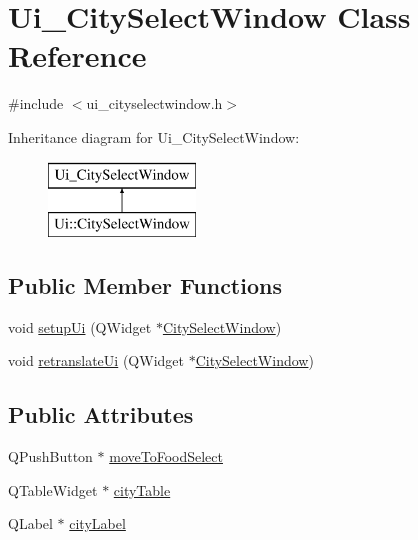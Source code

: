 \hypertarget{class_ui___city_select_window}{}\section{Ui\+\_\+\+City\+Select\+Window Class Reference}
\label{class_ui___city_select_window}


{\ttfamily \#include $<$ui\+\_\+cityselectwindow.\+h$>$}

Inheritance diagram for Ui\+\_\+\+City\+Select\+Window\+:\begin{figure}[H]
\begin{center}
\leavevmode
\includegraphics[height=2.000000cm]{class_ui___city_select_window}
\end{center}
\end{figure}
\subsection*{Public Member Functions}
\begin{DoxyCompactItemize}
\item 
void \mbox{\hyperlink{class_ui___city_select_window_a0984abfece713da5e3ef219fd6b4b640}{setup\+Ui}} (Q\+Widget $\ast$\mbox{\hyperlink{class_city_select_window}{City\+Select\+Window}})
\item 
void \mbox{\hyperlink{class_ui___city_select_window_ae7ea20821b449c19c09ae9ca73f03daf}{retranslate\+Ui}} (Q\+Widget $\ast$\mbox{\hyperlink{class_city_select_window}{City\+Select\+Window}})
\end{DoxyCompactItemize}
\subsection*{Public Attributes}
\begin{DoxyCompactItemize}
\item 
Q\+Push\+Button $\ast$ \mbox{\hyperlink{class_ui___city_select_window_a4ea2d95b45c0265a1f00dd4f3c85dd9c}{move\+To\+Food\+Select}}
\item 
Q\+Table\+Widget $\ast$ \mbox{\hyperlink{class_ui___city_select_window_a1973807be1feaaff2a82baafd22fbc14}{city\+Table}}
\item 
Q\+Label $\ast$ \mbox{\hyperlink{class_ui___city_select_window_af78028903db7e6b82f9d2fb50d3182d7}{city\+Label}}
\end{DoxyCompactItemize}


